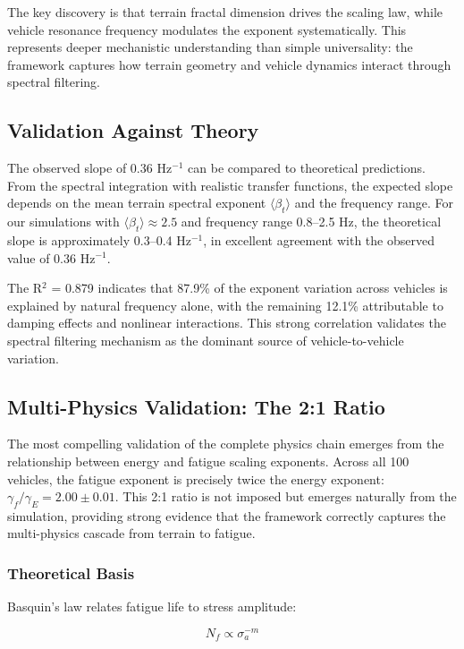 \documentclass[11pt,letterpaper]{article}
\begin{document}
The key discovery is that terrain fractal dimension drives the scaling law, while vehicle resonance frequency modulates the exponent systematically. This represents deeper mechanistic understanding than simple universality: the framework captures how terrain geometry and vehicle dynamics interact through spectral filtering.

\subsection{Validation Against Theory}

The observed slope of 0.36 Hz$^{-1}$ can be compared to theoretical predictions. From the spectral integration with realistic transfer functions, the expected slope depends on the mean terrain spectral exponent $\langle \beta_t \rangle$ and the frequency range. For our simulations with $\langle \beta_t \rangle \approx 2.5$ and frequency range 0.8--2.5 Hz, the theoretical slope is approximately 0.3--0.4 Hz$^{-1}$, in excellent agreement with the observed value of 0.36 Hz$^{-1}$.

The R$^2$ = 0.879 indicates that 87.9\% of the exponent variation across vehicles is explained by natural frequency alone, with the remaining 12.1\% attributable to damping effects and nonlinear interactions. This strong correlation validates the spectral filtering mechanism as the dominant source of vehicle-to-vehicle variation.

\subsection{Multi-Physics Validation: The 2:1 Ratio}

The most compelling validation of the complete physics chain emerges from the relationship between energy and fatigue scaling exponents. Across all 100 vehicles, the fatigue exponent is precisely twice the energy exponent: $\gamma_f / \gamma_E = 2.00 \pm 0.01$. This 2:1 ratio is not imposed but emerges naturally from the simulation, providing strong evidence that the framework correctly captures the multi-physics cascade from terrain to fatigue.

\subsubsection{Theoretical Basis}

Basquin's law relates fatigue life to stress amplitude:

\begin{equation}
N_f \propto \sigma_a^{-m}
\end{equation}
\end{document}
